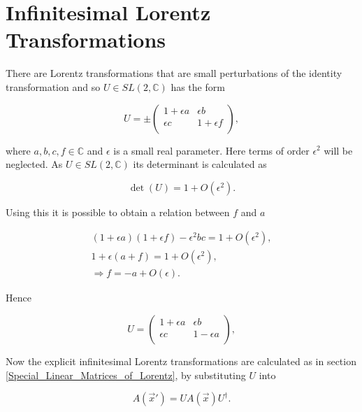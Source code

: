 \section{Infinitesimal Lorentz Transformations}

There are Lorentz transformations that are small perturbations of the identity transformation and so $U \in SL(2,\mathbb{C})$ has the form

\begin{equation*}
U = \pm
\left(
\begin{array}{cc}
1 + \epsilon a & \epsilon b \\
\epsilon c & 1 + \epsilon f \\
\end{array}
\right),
\end{equation*}

\noindent where $a,b,c,f \in \mathbb{C}$ and $\epsilon$ is a small real parameter. Here terms of order $\epsilon^2$ will be neglected. As $U \in SL(2,\mathbb{C})$ its determinant is calculated as

\begin{equation*}
\det{(U)} = 1 + O(\epsilon^2).
\end{equation*}

\noindent Using this it is possible to obtain a relation between $f$ and $a$

\begin{eqnarray*}
(1 + \epsilon a)(1 + \epsilon f) - \epsilon^2 b c = 1 + O(\epsilon^2), \\
1 + \epsilon (a +f) = 1 + O(\epsilon^2), \\
\Rightarrow f = -a + O(\epsilon).
\end{eqnarray*}

\noindent Hence 

\begin{equation*}
U =
\left(
\begin{array}{cc}
1 + \epsilon a & \epsilon b \\
\epsilon c & 1 - \epsilon a \\
\end{array}
\right),
\end{equation*}

Now the explicit infinitesimal Lorentz transformations are calculated as in section \ref{Special_Linear_Matrices_of_Lorentz}, by substituting $U$ into

\begin{equation*}
A(\vec{x}') = U A(\vec{x}) U^{\dagger}.
\end{equation*}

